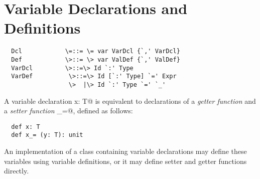 \documentclass[11pt]{report}
\newcommand{\iflet}[1]{}
\newcommand{\ifundefvar}[1]{}
\begin{document}
\iflet{
\section{Let Definitions}
\label{sec:letdef}

\syntax\begin{verbatim}
  PureDef      \=::= \= $\LET$ ValDef {`,' ValDef}
  ValDef       \>::= \> Id [`:' Type] `=' Expr
\end{verbatim}

A let definition $\LET;x: T = e$ defines $x$ as a name of the value
that results from the delayed evaluation of $e$. The type $T$ must be
a concrete value type (\sref{sec:types}) and the type of the
expression $e$ must conform to $T$. The effect of the let definition
is to bind the left-hand side $x$ to the result of evaluating $e$
converted to type $T$.  However, the expression $e$ is not evaluated
at the point of the let definition, but is instead evaluated the first
time $x$ is dereferenced during execution of the program (which might
be never at all). An attempt to dereference $x$ again in the course of
evaluation of $e$ leads to a run-time error.  Other threads trying to
dereference $x$ while $e$ is being evaluated block until evaluation is
complete.

The type $T$ may be omitted if it can be determined using local type
inference (\sref{sec:local-type-inf}).
}

\section{Variable Declarations and Definitions}
\label{sec:vardef}

\syntax\begin{verbatim}
  Dcl            \=::= \= var VarDcl {`,' VarDcl}
  Def            \>::= \> var ValDef {`,' ValDef}
  VarDcl         \>::=\> Id `:' Type
  VarDef          \>::=\> Id [`:' Type] `=' Expr
                  \>  |\> Id `:' Type `=' `_'
\end{verbatim}
\ifundefvar{
  PureDef \>::= \> $\VAR$ ValDcl {`,' ValDcl}
}

A variable declaration \verb@var x: T@ is equivalent to declarations
of a {\em getter function} \verb@x@ and a {\em setter function}
\verb@x_=@, defined as follows:

\begin{verbatim}
  def x: T
  def x_= (y: T): unit
\end{verbatim}

An implementation of a class containing variable declarations
may define these variables using variable definitions, or it may
define setter and getter functions directly.
\end{document}

